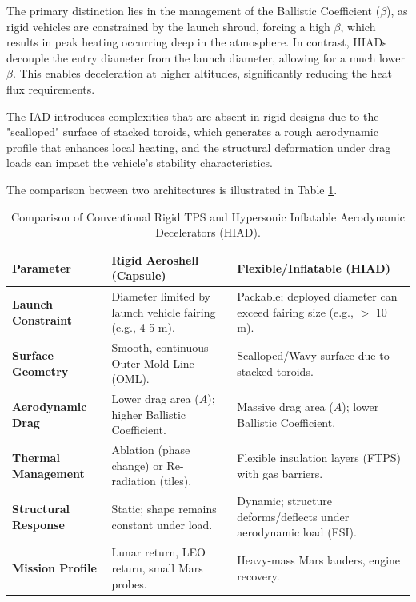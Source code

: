 The primary distinction lies in the management of the Ballistic Coefficient ($\beta$), as rigid vehicles are constrained by the launch shroud, forcing a high $\beta$, which results in peak heating occurring deep in the atmosphere. In contrast, HIADs decouple the entry diameter from the launch diameter, allowing for a much lower $\beta$. This enables deceleration at higher altitudes, significantly reducing the heat flux requirements.

The IAD introduces complexities that are absent in rigid designs due to the "scalloped" surface of stacked toroids, which generates a rough aerodynamic profile that enhances local heating, and the structural deformation under drag loads can impact the vehicle's stability characteristics.

The comparison between two architectures is illustrated in Table \ref{tab:tps_comparison}.

\begin{table}[H]
    \centering
    \caption{Comparison of Conventional Rigid TPS and Hypersonic Inflatable Aerodynamic Decelerators (HIAD).}
    \label{tab:tps_comparison}
    \begin{tabularx}{\textwidth}{|l|X|X|}
        \hline
        \rowcolor{gray!20} \textbf{Parameter} & \textbf{Rigid Aeroshell (Capsule)} & \textbf{Flexible/Inflatable (HIAD)} \\ \hline
        \textbf{Launch Constraint} & Diameter limited by launch vehicle fairing (e.g., 4-5 m). & Packable; deployed diameter can exceed fairing size (e.g., $>$ 10 m). \\ \hline
        \textbf{Surface Geometry} & Smooth, continuous Outer Mold Line (OML). & Scalloped/Wavy surface due to stacked toroids. \\ \hline
        \textbf{Aerodynamic Drag} & Lower drag area ($A$); higher Ballistic Coefficient. & Massive drag area ($A$); lower Ballistic Coefficient. \\ \hline
        \textbf{Thermal Management} & Ablation (phase change) or Re-radiation (tiles). & Flexible insulation layers (FTPS) with gas barriers. \\ \hline
        \textbf{Structural Response} & Static; shape remains constant under load. & Dynamic; structure deforms/deflects under aerodynamic load (FSI). \\ \hline %
        \textbf{Mission Profile} & Lunar return, LEO return, small Mars probes. & Heavy-mass Mars landers, engine recovery. \\ \hline
    \end{tabularx}
\end{table}
